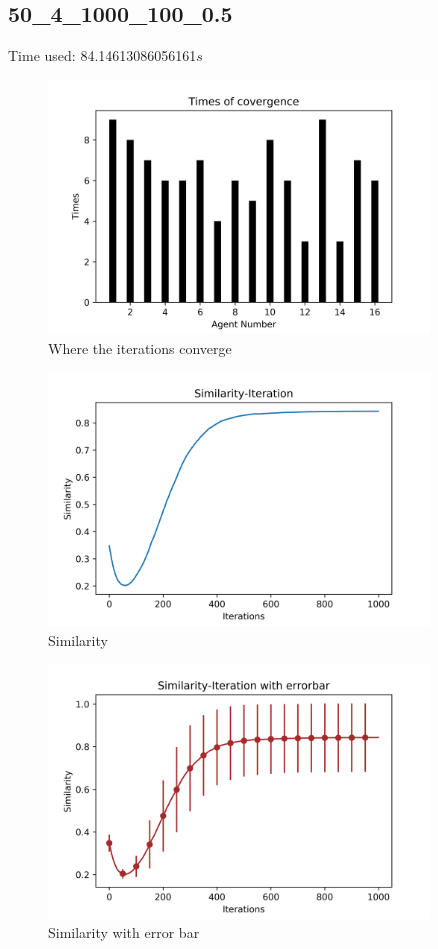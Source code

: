 \documentclass[a4paper,12pt]{article}
\begin{document}
    \subsection{50\_4\_1000\_100\_0.5}
    Time used: 84.14613086056161${s}$
       \begin{figure}[H]
    	\centering
    	\includegraphics[width=0.9\textwidth]{agt50_4_1000_100_e3}
    	\caption{Where the iterations converge}\label{agt50_4_1000_100_e3_h}
    \end{figure}
    \begin{figure}[H]
    	\centering
    	\includegraphics[width=0.9\textwidth]{Sim50_4_1000_100_e3}
    	\caption{Similarity}\label{Sim50_4_1000_100_e3_h}
    \end{figure}
    \begin{figure}[H]
    	\centering
    	\includegraphics[width=0.9\textwidth]{SimErr50_4_1000_100_e3}
    	\caption{Similarity with error bar}\label{SimErr50_4_1000_100_e3_h}
    \end{figure}
\end{document}

